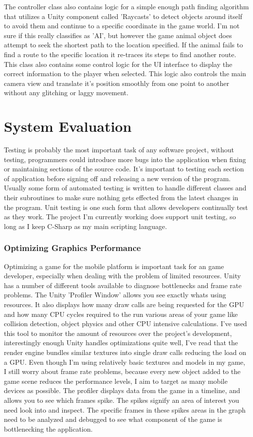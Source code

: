 The controller class also contains logic for a simple enough path finding algorithm that utilizes a Unity component called 'Raycasts' to detect objects around itself to avoid them and continue to a specific coordinate in the game world. I'm not sure if this really classifies as 'AI', but however the game animal object does attempt to seek the shortest path to the location specified. If the animal fails to find a route to the specific location it re-traces its steps to find another route.
This class also contains some control logic for the UI interface to display the correct information to the player when selected. This logic also controls the main camera view and translate it's position smoothly from one point to another without any glitching or laggy movement.

\chapter{System Evaluation}
Testing is probably the most important task of any software project, without testing, programmers could introduce more bugs into the application when fixing or maintaining sections of the source code. It's important to testing each section of application before signing off and releasing a new version of the program. Usually some form of automated testing is written to handle different classes and their subroutines to make sure nothing gets effected from the latest changes in the program. Unit testing is one such form that allows developers continually test as they work. The project I'm currently working does support unit testing, so long as I keep C-Sharp as my main scripting language.
\subsection{Optimizing Graphics Performance}
Optimizing a game for the mobile platform is important task for an game developer, especially when dealing with the problem of limited resources.
Unity has a number of different tools available to diagnose bottlenecks and frame rate problems. The Unity 'Profiler Window' allows you see exactly whats using resources. It also displays how many draw calls are being requested for the GPU and how many CPU cycles required to the run various areas of your game like collision detection, object physics and other CPU intensive calculations. I've used this tool to monitor the amount of resources over the project's development, interestingly enough Unity handles optimizations quite well, I've read that the render engine bundles similar textures into single draw calls reducing the load on a GPU. Even though I'm using relatively basic textures and models in my game, I still worry about frame rate problems, because every new object added to the game scene reduces the performance levels, I aim to target as many mobile devices as possible. The profiler displays data from the game in a timeline, and allows you to see which frames spike. The spikes signify an area of interest you need look into and inspect. The specific frames in these spikes areas in the graph need to be analyzed and debugged to see what component of the game is bottlenecking the application.
